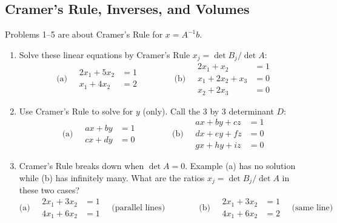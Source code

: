 \documentclass[14pt, a4paper]{article}
\begin{document}
\subsection{Cramer's Rule, Inverses, and Volumes}

\noindent Problems 1--5 are about Cramer's Rule for $x = A^{-1}b$.

\begin{enumerate}
    \item Solve these linear equations by Cramer's Rule $x_j = \det B_j / \det A$:
          \[
              \text{(a)} \quad \begin{aligned} 2x_1 + 5x_2 &= 1 \\ x_1 + 4x_2 &= 2 \end{aligned} \qquad\qquad
              \text{(b)} \quad \begin{aligned} 2x_1 + x_2 \quad &= 1 \\ x_1 + 2x_2 + x_3 &= 0 \\ x_2 + 2x_3 &= 0 \end{aligned}
          \]

    \item Use Cramer's Rule to solve for $y$ (only). Call the 3 by 3 determinant $D$:
          \[
              \text{(a)} \quad \begin{aligned} ax + by &= 1 \\ cx + dy &= 0 \end{aligned} \qquad\qquad
              \text{(b)} \quad \begin{aligned} ax + by + cz &= 1 \\ dx + ey + fz &= 0 \\ gx + hy + iz &= 0 \end{aligned}
          \]

    \item Cramer's Rule breaks down when $\det A = 0$. Example (a) has no solution while (b) has infinitely many. What are the ratios $x_j = \det B_j / \det A$ in these two cases?
          \[
              \text{(a)} \quad \begin{aligned} 2x_1 + 3x_2 &= 1 \\ 4x_1 + 6x_2 &= 1 \end{aligned} \quad \text{(parallel lines)} \qquad\qquad
              \text{(b)} \quad \begin{aligned} 2x_1 + 3x_2 &= 1 \\ 4x_1 + 6x_2 &= 2 \end{aligned} \quad \text{(same line)}
          \]


\end{enumerate}
\end{document}
